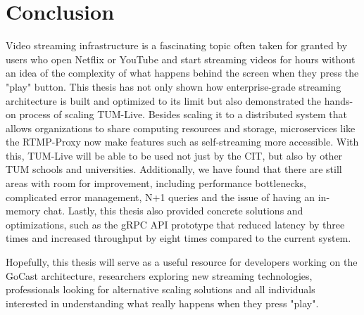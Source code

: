 
\chapter{Conclusion}\label{chapter:conclusion}

Video streaming infrastructure is a fascinating topic often taken for granted by users who open Netflix or YouTube and start streaming videos for hours without an idea of the complexity of what happens behind the screen when they press the "play" button. This thesis has not only shown how enterprise-grade streaming architecture is built and optimized to its limit but also demonstrated the hands-on process of scaling TUM-Live. Besides scaling it to a distributed system that allows organizations to share computing resources and storage, microservices like the RTMP-Proxy now make features such as self-streaming more accessible. With this, TUM-Live will be able to be used not just by the \ac{CIT}, but also by other \ac{TUM} schools and universities.
Additionally, we have found that there are still areas with room for improvement, including performance bottlenecks, complicated error management, N+1 queries and the issue of having an in-memory chat. Lastly, this thesis also provided concrete solutions and optimizations, such as the \ac{gRPC} \ac{API} prototype that reduced latency by three times and increased throughput by eight times compared to the current system.

Hopefully, this thesis will serve as a useful resource for developers working on the GoCast architecture, researchers exploring new streaming technologies, professionals looking for alternative scaling solutions and all individuals interested in understanding what really happens when they press "play".